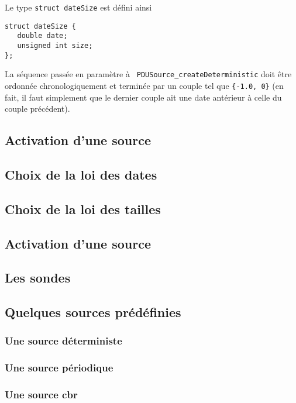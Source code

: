    Le type {\tt struct dateSize} est défini ainsi

\begin{verbatim}
struct dateSize {
   double date;
   unsigned int size;
};
\end{verbatim}

   La séquence passée en paramètre à {\tt
 PDUSource\_createDeterministic} doit être ordonnée
chronologiquement et terminée par un couple tel que {\tt \{-1.0, 0\}}
(en fait, il faut simplement que le dernier couple ait une date
antérieur à celle du couple précédent).

%
\subsection{Activation d'une source}

%
\subsection{Choix de la loi des dates}

%
\subsection{Choix de la loi des tailles}

%
\subsection{Activation d'une source}

%
\subsection{Les sondes}

%
\subsection{Quelques sources prédéfinies}

%
%
%
\subsubsection{Une source déterministe}

%
%
%
\subsubsection{Une source périodique}
%
%
%
\subsubsection{Une source {\sc cbr}}
